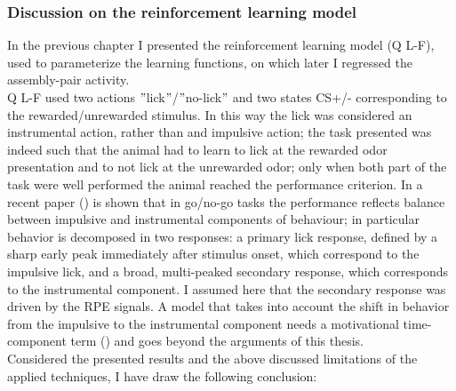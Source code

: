 \subsubsection{Discussion on the reinforcement learning model}
In the previous chapter I presented the reinforcement learning model (Q L-F), used to parameterize the learning functions, on which later I regressed the assembly-pair activity.\\Q L-F used two actions $"$lick$"$/$"$no-lick$"$ and two states CS+/- corresponding to the rewarded/unrewarded stimulus. In this way the lick was considered an instrumental action, rather than and impulsive action; the task presented was indeed such that the animal had to learn to lick at the rewarded odor presentation and to not lick at the unrewarded odor; only when both part of the task were well performed the animal  reached the performance criterion. In a recent paper (\cite{SchultzMot}) is shown that in go/no-go tasks the performance reflects balance between impulsive and instrumental components of behaviour; in particular behavior is decomposed in two  responses: a primary lick response, defined by a sharp early peak immediately after stimulus onset, which correspond to the impulsive lick, and a broad, multi-peaked secondary response, which corresponds to the instrumental component. I assumed here that the secondary response was driven by the RPE signals. A model that takes into account the shift in behavior from the impulsive to the instrumental component needs a motivational time-component term (\cite{SchultzMot}) and goes beyond the arguments of this thesis.\\Considered the presented results and the above discussed limitations of the applied techniques, I have draw the following conclusion:

